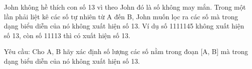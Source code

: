 John không hề thích con số 13 vì theo John đó là số không may mắn. Trong một lần phải liệt kê các số tự nhiên từ A đến B, John muốn lọc ra các số mà trong dạng biểu diễn của nó không xuất hiện số 13. Ví dụ số 1111145 không xuất hiện số 13, còn số 11113 thì có xuất hiện số 13.  

   Yêu cầu: Cho A, B hãy xác định số lượng các số nằm trong đoạn [A, B] mà trong dạng biểu diễn của nó không xuất hiện số 13.  

\